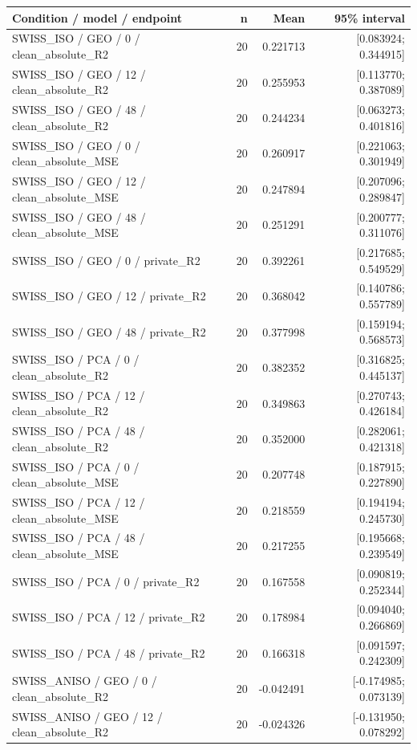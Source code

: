 \begin{longtable}{p{.56\linewidth}rrr}
\toprule Condition / model / endpoint & n & Mean & 95\% interval\\\midrule
SWISS\_ISO / GEO / 0 / clean\_absolute\_R2 & 20 & 0.221713 & [0.083924; 0.344915] \\
SWISS\_ISO / GEO / 12 / clean\_absolute\_R2 & 20 & 0.255953 & [0.113770; 0.387089] \\
SWISS\_ISO / GEO / 48 / clean\_absolute\_R2 & 20 & 0.244234 & [0.063273; 0.401816] \\
SWISS\_ISO / GEO / 0 / clean\_absolute\_MSE & 20 & 0.260917 & [0.221063; 0.301949] \\
SWISS\_ISO / GEO / 12 / clean\_absolute\_MSE & 20 & 0.247894 & [0.207096; 0.289847] \\
SWISS\_ISO / GEO / 48 / clean\_absolute\_MSE & 20 & 0.251291 & [0.200777; 0.311076] \\
SWISS\_ISO / GEO / 0 / private\_R2 & 20 & 0.392261 & [0.217685; 0.549529] \\
SWISS\_ISO / GEO / 12 / private\_R2 & 20 & 0.368042 & [0.140786; 0.557789] \\
SWISS\_ISO / GEO / 48 / private\_R2 & 20 & 0.377998 & [0.159194; 0.568573] \\
SWISS\_ISO / PCA / 0 / clean\_absolute\_R2 & 20 & 0.382352 & [0.316825; 0.445137] \\
SWISS\_ISO / PCA / 12 / clean\_absolute\_R2 & 20 & 0.349863 & [0.270743; 0.426184] \\
SWISS\_ISO / PCA / 48 / clean\_absolute\_R2 & 20 & 0.352000 & [0.282061; 0.421318] \\
SWISS\_ISO / PCA / 0 / clean\_absolute\_MSE & 20 & 0.207748 & [0.187915; 0.227890] \\
SWISS\_ISO / PCA / 12 / clean\_absolute\_MSE & 20 & 0.218559 & [0.194194; 0.245730] \\
SWISS\_ISO / PCA / 48 / clean\_absolute\_MSE & 20 & 0.217255 & [0.195668; 0.239549] \\
SWISS\_ISO / PCA / 0 / private\_R2 & 20 & 0.167558 & [0.090819; 0.252344] \\
SWISS\_ISO / PCA / 12 / private\_R2 & 20 & 0.178984 & [0.094040; 0.266869] \\
SWISS\_ISO / PCA / 48 / private\_R2 & 20 & 0.166318 & [0.091597; 0.242309] \\
SWISS\_ANISO / GEO / 0 / clean\_absolute\_R2 & 20 & -0.042491 & [-0.174985; 0.073139] \\
SWISS\_ANISO / GEO / 12 / clean\_absolute\_R2 & 20 & -0.024326 & [-0.131950; 0.078292] \\

\end{longtable}
